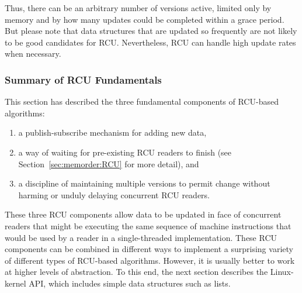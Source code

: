 {{	Thus, there can be an arbitrary number of versions active,
	limited only by memory and by how many updates could be completed
	within a grace period.
	But please note that data structures that are updated so frequently
	are not likely to be good candidates for RCU\@.
	Nevertheless, RCU can handle high update rates when necessary.
}\QuickQuizEndE
}

\subsubsection{Summary of RCU Fundamentals}
\label{sec:defer:Summary of RCU Fundamentals}

This section has described the three fundamental components of RCU-based
algorithms:

\begin{enumerate}
\item	a publish-subscribe mechanism for adding new data,

\item	a way of waiting for pre-existing RCU readers to finish
	(see Section~\ref{sec:memorder:RCU} for more detail),
	and

\item	a discipline of maintaining multiple versions to permit
	change without harming or unduly delaying concurrent RCU readers.
\end{enumerate}

\QuickQuizEnd

These three RCU components allow data to be updated in face of concurrent
readers that might be executing the same sequence of machine instructions
that would be used by a reader in a single-threaded implementation.
These RCU components can be combined in different ways to implement a
surprising variety of different types of RCU-based algorithms.
However, it is usually better to work at higher levels of abstraction.
To this end, the next section describes the Linux-kernel API, which
includes simple data structures such as lists.
